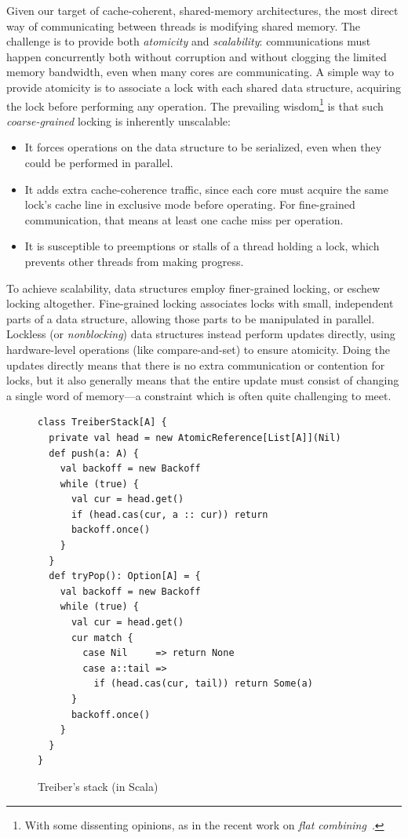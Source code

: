 \documentclass[preprint,nocopyrightspace]{sigplanconf}
\begin{document}

Given our target of cache-coherent, shared-memory architectures, the
most direct way of communicating between threads is modifying shared
memory.  The challenge is to provide both \emph{atomicity} and
\emph{scalability}: communications must happen concurrently both
without corruption and without clogging the limited memory bandwidth,
even when many cores are communicating.  A simple way to provide
atomicity is to associate a lock with each shared data structure,
acquiring the lock before performing any operation.  The prevailing
wisdom\footnote{With some dissenting opinions, as in the recent work on
  \emph{flat combining}~\cite{Hendler2010}.} is
that such \emph{coarse-grained} locking is inherently unscalable:
\begin{itemize}
\item It forces operations on the data structure to be serialized,
  even when they could be performed in parallel.
\item It adds extra cache-coherence traffic, since each core must
  acquire the same lock's cache line in exclusive mode before
  operating.  For fine-grained communication, that means at least one
  cache miss per operation.
\item It is susceptible to preemptions or stalls of a
  thread holding a lock, which prevents other threads from making progress.
\end{itemize}

To achieve scalability, data structures employ finer-grained locking,
or eschew locking altogether.  Fine-grained locking associates locks
with small, independent parts of a data structure, allowing those
parts to be manipulated in parallel.  Lockless (or \emph{nonblocking})
data structures instead perform updates directly, using hardware-level
operations (like compare-and-set) to ensure atomicity.  Doing the
updates directly means that there is no extra communication or
contention for locks, but it also generally means that the entire
update must consist of changing a single word of memory---a constraint
which is often quite challenging to meet.

\begin{figure}
\begin{lstlisting}[frame=single]
class TreiberStack[A] {
  private val head = new AtomicReference[List[A]](Nil)
  def push(a: A) {
    val backoff = new Backoff
    while (true) {
      val cur = head.get()
      if (head.cas(cur, a :: cur)) return
      backoff.once()
    }
  }
  def tryPop(): Option[A] = {
    val backoff = new Backoff
    while (true) {
      val cur = head.get() 
      cur match {
        case Nil     => return None
        case a::tail => 
          if (head.cas(cur, tail)) return Some(a)
      }
      backoff.once()
    }
  }
}
\end{lstlisting}
\nocaptionrule
\caption{Treiber's stack (in Scala)}
\label{fig:classic-treiber}
\end{figure}
\end{document}
